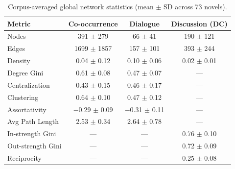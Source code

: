 
\begin{table}[h]
\centering
\small
\caption{Corpus-averaged global network statistics (mean $\pm$ SD across 73 novels).}
\label{tab:corpus-summary}
\begin{tabular}{lccc}
\toprule
\textbf{Metric} & \textbf{Co-occurrence} & \textbf{Dialogue} & \textbf{Discussion (DC)} \\
\midrule
Nodes & 391 $\pm$ 279 & 66 $\pm$ 41 & 190 $\pm$ 121 \\
Edges & 1699 $\pm$ 1857 & 157 $\pm$ 101 & 393 $\pm$ 244 \\
Density & 0.04 $\pm$ 0.12 & 0.10 $\pm$ 0.06 & 0.02 $\pm$ 0.01 \\
Degree Gini & 0.61 $\pm$ 0.08 & 0.47 $\pm$ 0.07 & --- \\
Centralization & 0.43 $\pm$ 0.15 & 0.46 $\pm$ 0.17 & --- \\
Clustering & 0.64 $\pm$ 0.10 & 0.47 $\pm$ 0.12 & --- \\
Assortativity & $-$0.29 $\pm$ 0.09 & $-$0.31 $\pm$ 0.11 & --- \\
Avg Path Length & 2.53 $\pm$ 0.34 & 2.64 $\pm$ 0.78 & --- \\
\midrule
In-strength Gini & --- & --- & 0.76 $\pm$ 0.10 \\
Out-strength Gini & --- & --- & 0.72 $\pm$ 0.09 \\
Reciprocity & --- & --- & 0.25 $\pm$ 0.08 \\
\bottomrule
\end{tabular}
\end{table}



